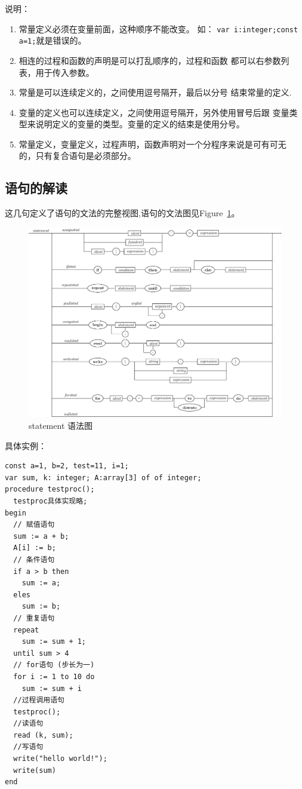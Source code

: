 说明：
\begin{enumerate}
	\item 常量定义必须在变量前面，这种顺序不能改变。
		如： \verb|var i:integer;const a=1;|就是错误的。
	\item 相连的过程和函数的声明是可以打乱顺序的，过程和函数
		都可以右参数列表，用于传入参数。
	\item 常量是可以连续定义的，之间使用逗号隔开，最后以分号
		结束常量的定义.
	\item 变量的定义也可以连续定义，之间使用逗号隔开，另外使用冒号后跟
		变量类型来说明定义的变量的类型。变量的定义的结束是使用分号。
	\item 常量定义，变量定义，过程声明，函数声明对一个分程序来说是可有可无
		的，只有复合语句是必须部分。
\end{enumerate}
\subsection{语句的解读}









这几句定义了语句的文法的完整视图,语句的文法图见Figure~\ref{statement}。
\begin{figure}[!h]
\begin{center}
    \includegraphics[scale=.6]{Figures/statement.eps}
\end{center}
\caption{statement 语法图}
\label{statement}
\end{figure}
具体实例：
\begin{verbatim}
const a=1, b=2, test=11, i=1;
var sum, k: integer; A:array[3] of of integer;
procedure testproc();
  testproc具体实现略;
begin
  // 赋值语句
  sum := a + b;
  A[i] := b;
  // 条件语句
  if a > b then
    sum := a;
  eles
    sum := b;
  // 重复语句
  repeat
    sum := sum + 1;
  until sum > 4
  // for语句 (步长为一)
  for i := 1 to 10 do
    sum := sum + i
  //过程调用语句
  testproc();
  //读语句
  read (k, sum);
  //写语句
  write("hello world!");
  write(sum)
end
\end{verbatim}
